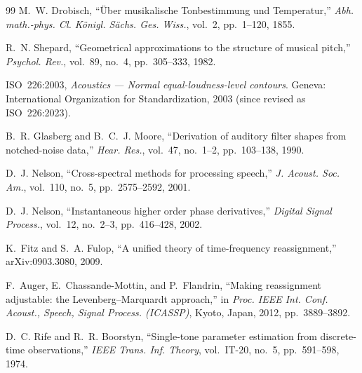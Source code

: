 \documentclass[10pt,a4paper,twocolumn]{article}
\begin{document}
\begin{thebibliography}{99}
M.~W. Drobisch, ``Über musikalische Tonbestimmung und Temperatur,'' \emph{Abh. math.-phys. Cl. Königl. Sächs. Ges. Wiss.}, vol.~2, pp.~1--120, 1855.

R.~N. Shepard, ``Geometrical approximations to the structure of musical pitch,'' \emph{Psychol. Rev.}, vol.~89, no.~4, pp.~305--333, 1982.

ISO~226:2003, \emph{Acoustics --- Normal equal-loudness-level contours}. Geneva: International Organization for Standardization, 2003 (since revised as ISO~226:2023).

B.~R. Glasberg and B.~C.~J. Moore, ``Derivation of auditory filter shapes from notched-noise data,'' \emph{Hear. Res.}, vol.~47, no.~1--2, pp.~103--138, 1990.

D.~J. Nelson, ``Cross-spectral methods for processing speech,'' \emph{J. Acoust. Soc. Am.}, vol.~110, no.~5, pp.~2575--2592, 2001.

D.~J. Nelson, ``Instantaneous higher order phase derivatives,'' \emph{Digital Signal Process.}, vol.~12, no.~2--3, pp.~416--428, 2002.

K.~Fitz and S.~A. Fulop, ``A unified theory of time-frequency reassignment,'' arXiv:0903.3080, 2009.

F.~Auger, E.~Chassande-Mottin, and P.~Flandrin, ``Making reassignment adjustable: the Levenberg--Marquardt approach,'' in \emph{Proc. IEEE Int. Conf. Acoust., Speech, Signal Process. (ICASSP)}, Kyoto, Japan, 2012, pp.~3889--3892.

D.~C. Rife and R.~R. Boorstyn, ``Single-tone parameter estimation from discrete-time observations,'' \emph{IEEE Trans. Inf. Theory}, vol.~IT-20, no.~5, pp.~591--598, 1974.

\end{thebibliography}
\end{document}
